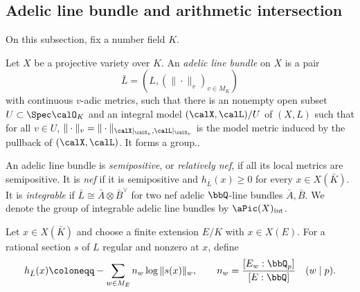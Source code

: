 \subsection[status=draft,tag=0000000,label=\labelNFM{subsec:adelic-line-bundle-and-positivity}]{Adelic line bundle and arithmetic intersection}

On this subsection, fix a number field $K$.
\Yang{}



\begin{definition}[label=\labelNFM{def:adelic-line-bundle-projective-case}, status=draft, tag=0000000]
	Let $X$ be a projective variety over $K$.
	An \emph{adelic line bundle} on $X$ is a pair
	\[ \bar L = (L,(\|\cdot\|_v)_{v \in M_K}) \]
	with continuous $v$-adic metrics, such that there is an nonempty open subset $U \subset \Spec \calO_K$ and an integral model $(\calX,\calL)/U$ of $(X,L)$ such that for all $v \in U$, $\|\cdot\|_v = \|\cdot\|_{\calX|_{\calO_v},\calL|_{\calO_v}}$ is the model metric induced by the pullback of $(\calX,\calL)$.
	It forms a group..
	\Yang{}
\end{definition}

\begin{definition}[label=\labelNFM{def:positivity-of-adelic-line-bundles}, status=draft, tag=0000000]
	An adelic line bundle is \emph{semipositive}, or \emph{relatively nef}, if all its local metrics are semipositive.
	It is \emph{nef} if it is semipositive and $h_{\bar L}(x) \geq 0$ for every $x \in X(\bar K)$.
	It is \emph{integrable} if $\bar L \cong \bar A \otimes \bar B^\vee$ for two nef adelic $\bbQ$-line bundles $\bar A,\bar B$.
	We denote the group of integrable adelic line bundles by $\aPic(X)_{\mathrm{int}}$.
	\Yang{}
\end{definition}

\begin{proposition}[label=\labelNFM{prop:fundamental-properties-of-adelic-line-bundle}, status=draft, tag=0000000]
\end{proposition}

\begin{definition}[label=\labelNFM{def:height-of-an-algebraic-point}, status=draft, tag=0000000]
	Let $x \in X(\bar K)$ and choose a finite extension $E/K$ with $x \in X(E)$.
	For a rational section $s$ of $L$ regular and nonzero at $x$, define
	\[ h_{\bar L}(x) \coloneqq -\sum_{w \in M_E}n_w\log\|s(x)\|_w, \qquad n_w = \frac{[E_w:\bbQ_p]}{[E:\bbQ]} \quad (w \mid p). \]
\end{definition}

